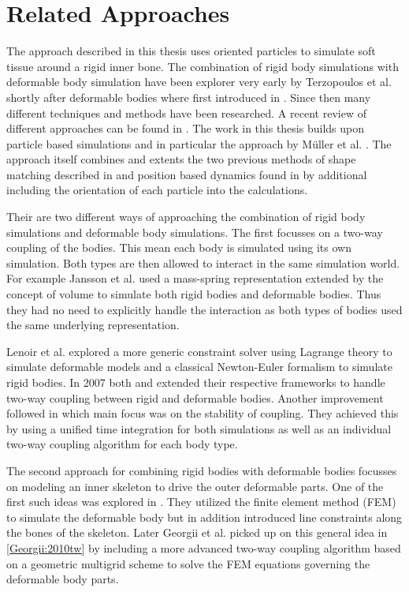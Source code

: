 \chapter{Related Approaches}
\label{cha:related_approaches}

The approach described in this thesis uses oriented particles to simulate soft tissue around a rigid inner bone. The combination of rigid body simulations with deformable body simulation have been explorer very early by Terzopoulos et al. \cite{Terzopoulos:1988bz} shortly after deformable bodies where first introduced in \cite{Terzopoulos:1987gf}. Since then many different techniques and methods have been researched. A recent review of different approaches can be found in \cite{Nealen:2006vp}. The work in this thesis builds upon particle based simulations and in particular the approach by M{\"u}ller et al. \cite{Muller:2011gn}. The approach itself combines and extents the two previous methods of shape matching described in \cite{Muller:2005fi} and position based dynamics found in \cite{Muller:2007vs} by additional including the orientation of each particle into the calculations.

Their are two different ways of approaching the combination of rigid body simulations and deformable body simulations. The first focusses on a two-way coupling of the bodies. This mean each body is simulated using its own simulation. Both types are then allowed to interact in the same simulation world. For example Jansson et al. \cite{Jansson:2003cb} used a mass-spring representation extended by the concept of volume to simulate both rigid bodies and deformable bodies. Thus they had no need to explicitly handle the interaction as both types of bodies used the same underlying representation.

Lenoir et al. \cite{Lenoir:2004ic} explored a more generic constraint solver using Lagrange theory to simulate deformable models and a classical Newton-Euler formalism to simulate rigid bodies. In 2007 both \cite{Muller:2007vs} and \cite{Sifakis:2007to} extended their respective frameworks to handle two-way coupling between rigid and deformable bodies. Another improvement followed in \cite{Shinar:2008va} which main focus was on the stability of coupling. They achieved this by using a unified time integration for both simulations as well as an individual two-way coupling algorithm for each body type.

The second approach for combining rigid bodies with deformable bodies focusses on modeling an inner skeleton to drive the outer deformable parts. One of the first such ideas was explored in \cite{Capell:2002ge}. They utilized the finite element method (FEM) to simulate the deformable body but in addition introduced line constraints along the bones of the skeleton. Later Georgii et al. picked up on this general idea in \ref{Georgii:2010tw} by including a more advanced two-way coupling algorithm based on a geometric multigrid scheme to solve the FEM equations governing the deformable body parts.

